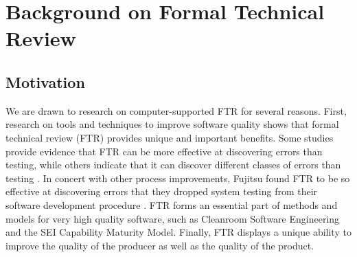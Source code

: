 
\section{Background on Formal Technical Review}

\subsection{Motivation}

We are drawn to research on computer-supported FTR for several reasons.
First, research on tools and techniques to improve software quality shows
that formal technical review (FTR) provides unique and important benefits.
Some studies provide evidence that FTR can be more effective at discovering
errors than testing, while others indicate that it can discover different
classes of errors than testing \cite{Myers78,Basili86}.  In concert with
other process improvements, Fujitsu found FTR to be so effective at
discovering errors that they dropped system testing from their software
development procedure \cite{Arthur93}.  FTR forms an essential part of
methods and models for very high quality software, such as Cleanroom
Software Engineering and the SEI Capability Maturity Model.  Finally, FTR
displays a unique ability to improve the quality of the producer as well as
the quality of the product.

